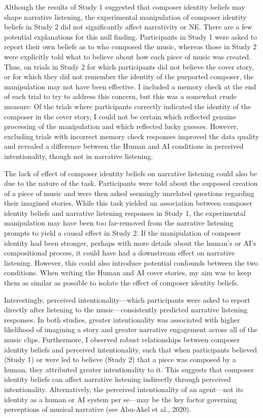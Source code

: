 \documentclass[12pt,twoside]{reedthesis}
\begin{document}
Although the results of Study 1 suggested that composer identity beliefs may shape narrative listening, the experimental manipulation of composer identity beliefs in Study 2 did not significantly affect narrativity or NE. There are a few potential explanations for this null finding. Participants in Study 1 were asked to report their own beliefs as to who composed the music, whereas those in Study 2 were explicitly told what to believe about how each piece of music was created. Thus, on trials in Study 2 for which participants did not believe the cover story, or for which they did not remember the identity of the purported composer, the manipulation may not have been effective. I included a memory check at the end of each trial to try to address this concern, but this was a somewhat crude measure: Of the trials where participants correctly indicated the identity of the composer in the cover story, I could not be certain which reflected genuine processing of the manipulation and which reflected lucky guesses. However, excluding trials with incorrect memory check responses improved the data quality and revealed a difference between the Human and AI conditions in perceived intentionality, though not in narrative listening.

The lack of effect of composer identity beliefs on narrative listening could also be due to the nature of the task. Participants were told about the supposed creation of a piece of music and were then asked seemingly unrelated questions regarding their imagined stories. While this task yielded an association between composer identity beliefs and narrative listening responses in Study 1, the experimental manipulation may have been too far-removed from the narrative listening prompts to yield a causal effect in Study 2. If the manipulation of composer identity had been stronger, perhaps with more details about the human’s or AI’s compositional process, it could have had a downstream effect on narrative listening. However, this could also introduce potential confounds between the two conditions. When writing the Human and AI cover stories, my aim was to keep them as similar as possible to isolate the effect of composer identity beliefs.

Interestingly, perceived intentionality—which participants were asked to report directly after listening to the music—consistently predicted narrative listening responses. In both studies, greater intentionality was associated with higher likelihood of imagining a story and greater narrative engagement across all of the music clips. Furthermore, I observed robust relationships between composer identity beliefs and perceived intentionality, such that when participants believed (Study 1) or were led to believe (Study 2) that a piece was composed by a human, they attributed greater intentionality to it. This suggests that composer identity beliefs can affect narrative listening indirectly through perceived intentionality. Alternatively, the perceived intentionality of an agent—not its identity as a human or AI system per se—may be the key factor governing perceptions of musical narrative (see Abu-Akel et al., 2020). 
\end{document}
